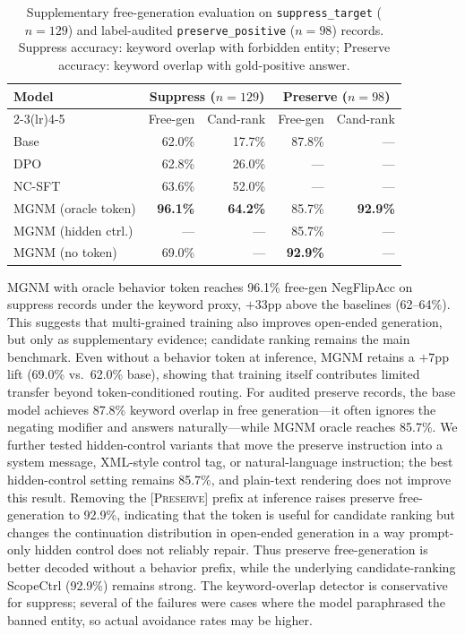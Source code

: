 \documentclass[letterpaper]{article}
\begin{document}
\begin{table}[t]
\centering
\small
\caption{Supplementary free-generation evaluation on \texttt{suppress\_target} ($n{=}129$) and
  label-audited \texttt{preserve\_positive} ($n{=}98$) records.
  Suppress accuracy: keyword overlap with forbidden entity; Preserve accuracy:
  keyword overlap with gold-positive answer.}
\label{tab:freegen}
\setlength{\tabcolsep}{5pt}
\begin{tabular}{lrrrr}
\toprule
Model & \multicolumn{2}{c}{Suppress ($n{=}129$)} & \multicolumn{2}{c}{Preserve ($n{=}98$)} \\
\cmidrule(lr){2-3}\cmidrule(lr){4-5}
 & Free-gen & Cand-rank & Free-gen & Cand-rank \\
\midrule
Base       & 62.0\% & 17.7\% & 87.8\% & --- \\
DPO        & 62.8\% & 26.0\% & ---    & --- \\
NC-SFT     & 63.6\% & 52.0\% & ---    & --- \\
MGNM (oracle token)  & \textbf{96.1\%} & \textbf{64.2\%} & 85.7\% & \textbf{92.9\%} \\
MGNM (hidden ctrl.) & --- & --- & 85.7\% & --- \\
MGNM (no token)      & 69.0\% & --- & \textbf{92.9\%} & --- \\
\bottomrule
\end{tabular}
\end{table}

MGNM with oracle behavior token reaches 96.1\% free-gen NegFlipAcc on suppress
records under the keyword proxy, $+33$pp above the baselines (62--64\%).
This suggests that multi-grained training also improves open-ended generation,
but only as supplementary evidence; candidate ranking remains the main
benchmark.
Even without a behavior token at inference, MGNM retains a $+7$pp lift
(69.0\% vs.\ 62.0\% base), showing that training itself contributes limited
transfer beyond token-conditioned routing.
For audited preserve records, the base model achieves 87.8\% keyword overlap in free
generation---it often ignores the negating modifier and answers naturally---while
MGNM oracle reaches 85.7\%.
We further tested hidden-control variants that move the preserve instruction into
a system message, XML-style control tag, or natural-language instruction; the
best hidden-control setting remains 85.7\%, and plain-text rendering does not
improve this result.
Removing the \textsc{[Preserve]} prefix at inference raises preserve free-generation
to 92.9\%, indicating that the token is useful for candidate ranking but changes
the continuation distribution in open-ended generation in a way prompt-only
hidden control does not reliably repair.
Thus preserve free-generation is better decoded without a behavior prefix,
while the underlying candidate-ranking ScopeCtrl (92.9\%) remains strong.
The keyword-overlap detector is conservative for suppress; several of the failures
were cases where the model paraphrased the banned entity, so actual avoidance
rates may be higher.
\end{document}
